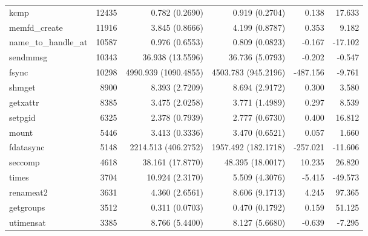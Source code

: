 \begin{longtable}{>{\ttfamily}lrrrrr}
                           kcmp &       12435 &           0.782 (0.2690) &           0.919 (0.2704) &           0.138 &       17.633 \\
                  memfd\_create &       11916 &           3.845 (0.8666) &           4.199 (0.8787) &           0.353 &        9.182 \\
           name\_to\_handle\_at &       10587 &           0.976 (0.6553) &           0.809 (0.0823) &          -0.167 &      -17.102 \\
                       sendmmsg &       10343 &         36.938 (13.5596) &          36.736 (5.0793) &          -0.202 &       -0.547 \\
                          fsync &       10298 &     4990.939 (1090.4855) &      4503.783 (945.2196) &        -487.156 &       -9.761 \\
                         shmget &        8900 &           8.393 (2.7209) &           8.694 (2.9172) &           0.300 &        3.580 \\
                       getxattr &        8385 &           3.475 (2.0258) &           3.771 (1.4989) &           0.297 &        8.539 \\
                        setpgid &        6325 &           2.378 (0.7939) &           2.777 (0.6730) &           0.400 &       16.812 \\
                          mount &        5446 &           3.413 (0.3336) &           3.470 (0.6521) &           0.057 &        1.660 \\
                      fdatasync &        5148 &      2214.513 (406.2752) &      1957.492 (182.1718) &        -257.021 &      -11.606 \\
                        seccomp &        4618 &         38.161 (17.8770) &         48.395 (18.0017) &          10.235 &       26.820 \\
                          times &        3704 &          10.924 (2.3170) &           5.509 (4.3076) &          -5.415 &      -49.573 \\
                      renameat2 &        3631 &           4.360 (2.6561) &           8.606 (9.1713) &           4.245 &       97.365 \\
                      getgroups &        3512 &           0.311 (0.0703) &           0.470 (0.1792) &           0.159 &       51.125 \\
                      utimensat &        3385 &           8.766 (5.4400) &           8.127 (5.6680) &          -0.639 &       -7.295 \\

\end{longtable}
